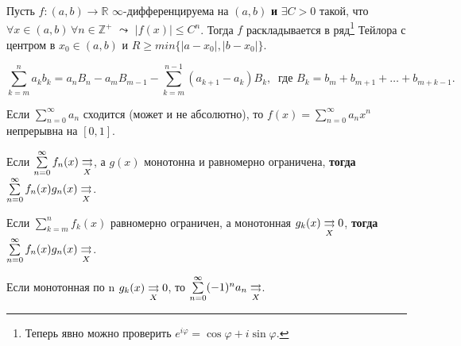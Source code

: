 \begin{to_thr}
\label{4.58}
	Пусть $f\colon (a,b) \to \mathbb{R}$ $\infty$-дифференцируема на $(a,b)$ \textbf{и} $\exists C > 0$ такой, что $\forall x \in (a,b)\, \forall n \in \mathbb{Z}^+$ $\leadsto$ $|f(x)| \leq C^n$. Тогда $f$ раскладывается в ряд\footnote{
	Теперь явно можно проверить $e^{i \varphi} = \cos \varphi + i \sin \varphi$.
	} Тейлора с центром в $x_0 \in (a,b)$ и $R\geq min\{ |a-x_0|, |b - x_0|\}$.
\end{to_thr}

\begin{to_thr}
\label{dpA}
$$
\sum\limits_{k=m}^{n}a_{k}b_{k}=a_{n}B_{n}-a_{m}B_{m-1}-\sum \limits _{k=m}^{n-1}(a_{k+1}-a_{k})B_{k}, \; \; \text{где } B_k = b_m + b_{m+1} + \dots + b_{m+k-1}.
$$
\end{to_thr}

\begin{to_thr}
\label{4.61}
	Если $\sum\limits_{n = 0}^{\infty} a_n$ сходится (может и не абсолютно), то $f(x) = \sum\limits_{n = 0}^{\infty} a_n x^n$ непрерывна на $[0,1]$.
\end{to_thr}

\begin{to_thr}
\label{4.62}
	Если $\sum\limits_{n = 0}^{\infty} f_n (x) \underset{X}{\rightrightarrows}$, а $g(x)$ монотонна и равномерно ограничена, \textbf{тогда} $\sum\limits_{n = 0}^{\infty} f_n(x) g_n(x) \underset{X}{\rightrightarrows}$.
\end{to_thr}

\begin{to_thr}
\label{4.63}
	Если $\sum\limits_{k = m}^{n} f_k (x)$ равномерно ограничен, а монотонная $g_k(x) \underset{X}{\rightrightarrows} 0$, \textbf{тогда} $\sum\limits_{n = 0}^{\infty} f_n(x) g_n(x) \underset{X}{\rightrightarrows}$.
\end{to_thr}

\begin{to_thr}
\label{4.64}
	Если монотонная по n $g_k(x) \underset{X}{\rightrightarrows} 0$, то $\sum\limits_{n = 0}^{\infty} (-1)^n a_n \underset{X}{\rightrightarrows}$.
\end{to_thr}